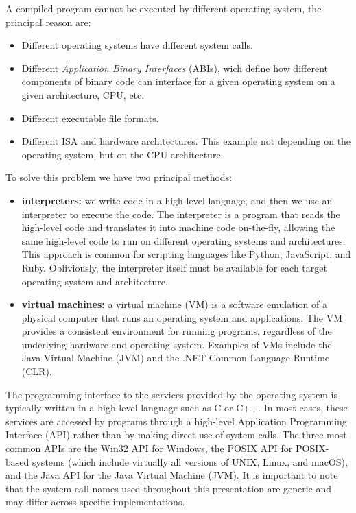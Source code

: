     A compiled program cannot be executed by different operating system, the principal reason are:
    \begin{itemize}
        \item Different operating systems have different system calls.
        \item Different \emph{Application Binary Interfaces} (ABIs), wich define how different components of binary code can interface for a given operating system on a given architecture, CPU, etc.
        \item Different executable file formats.
        \item Different ISA and hardware architectures. This example not depending on the operating system, but on the CPU architecture.
    \end{itemize}
    To solve this problem we have two principal methods:
    \begin{itemize}
        \item \textbf{interpreters:} we write code in a high-level language, and then we use an interpreter to execute the code. The interpreter is a program that reads the high-level code and translates it into machine code on-the-fly, allowing the same high-level code to run on different operating systems and architectures. This approach is common for scripting languages like Python, JavaScript, and Ruby. Obliviously, the interpreter itself must be available for each target operating system and architecture.
        \item \textbf{virtual machines:} a virtual machine (VM) is a software emulation of a physical computer that runs an operating system and applications. The VM provides a consistent environment for running programs, regardless of the underlying hardware and operating system. Examples of VMs include the Java Virtual Machine (JVM) and the .NET Common Language Runtime (CLR).
    \end{itemize}


    The programming interface to the services provided by the operating system is typically written in a high-level language such as C or C++. In most cases, these services are accessed by programs through a high-level Application Programming Interface (API) rather than by making direct use of system calls. The three most common APIs are the Win32 API for Windows, the POSIX API for POSIX-based systems (which include virtually all versions of UNIX, Linux, and macOS), and the Java API for the Java Virtual Machine (JVM). It is important to note that the system-call names used throughout this presentation are generic and may differ across specific implementations.


